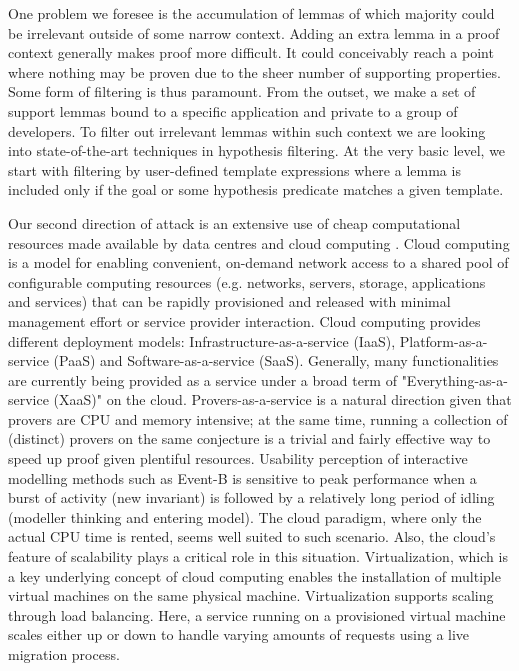 \documentclass[twocolumn,a4paper,10pt]{article}
\begin{document}
One problem we foresee is the accumulation of lemmas of which majority could be irrelevant outside of some narrow context. Adding an extra lemma in a proof context generally makes proof more difficult. It could conceivably reach a point where nothing may be proven due to the sheer number of supporting properties. Some form of filtering is thus paramount. From the outset, we make a set of support lemmas bound to a specific application and private to a group of developers. To filter out irrelevant lemmas within such context we are looking into state-of-the-art techniques in hypothesis filtering. At the very basic level, we start with filtering by user-defined template expressions where a lemma is included only if the goal or some hypothesis predicate matches a given template. 

Our second direction of attack is an extensive use of cheap computational resources made available by data centres and cloud computing \cite{cloud}. Cloud computing is a model for enabling convenient, on-demand network access to a shared pool of configurable computing resources (e.g. networks, servers, storage, applications and services) that can be rapidly provisioned and released with minimal management effort or service provider interaction. Cloud computing provides different deployment models: Infrastructure-as-a-service (IaaS), Platform-as-a-service (PaaS) and Software-as-a-service (SaaS). Generally, many functionalities are currently being provided as a service under a broad term of "Everything-as-a-service (XaaS)" on the cloud. Provers-as-a-service is a natural direction given that provers are CPU and memory intensive; at the same time, running a collection of (distinct) provers on the same conjecture is a trivial and fairly effective way to speed up proof given plentiful resources. Usability perception of interactive modelling methods such as Event-B is sensitive to peak performance when a burst of activity (new invariant) is followed by a relatively long period of idling (modeller thinking and entering model). The cloud paradigm, where only the actual CPU time is rented, seems well suited to such scenario. Also, the cloud's feature of scalability plays a critical role in this situation. Virtualization, which is a key underlying concept of cloud computing enables the installation of multiple virtual machines on the same physical machine. Virtualization supports scaling through load balancing. Here, a service running on a provisioned virtual machine scales either up or down to handle varying amounts of requests using a live migration process.
\end{document}
